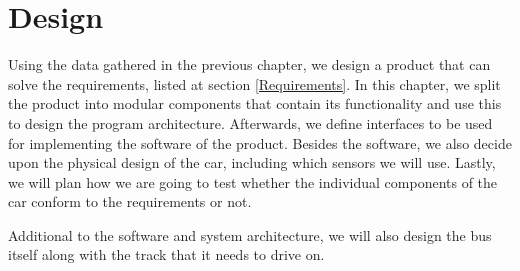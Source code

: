 \chapter{Design}

Using the data gathered in the previous chapter, we design a product that can solve the requirements, listed at section \ref{Requirements}. In this chapter, we split the product into modular components that contain its functionality and use this to design the program architecture. Afterwards, we define interfaces to be used for implementing the software of the product. Besides the software, we also decide upon the physical design of the car, including which sensors we will use. Lastly, we will plan how we are going to test whether the individual components of the car conform to the requirements or not.







Additional to the software and system architecture, we will also design the bus itself along with the track that it needs to drive on. 



